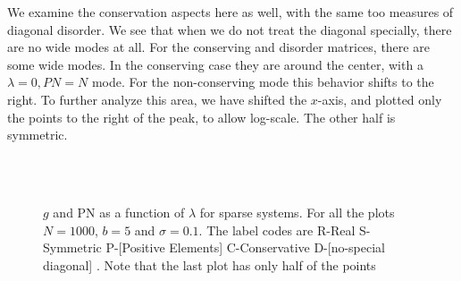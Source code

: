 \documentclass[onecolumn,fleqn,longbibliography]{revtex4}
\begin{document}
We examine the conservation aspects here as well, with the same
too measures of diagonal disorder. We see that when we do not treat the diagonal
specially, there are no wide modes at all. For the conserving and disorder matrices,
there are some wide modes. In the conserving case they are around the center, with a $\lambda=0, PN=N$ mode.
For the non-conserving mode this behavior shifts to the right. To further
analyze this area, we have shifted the $x$-axis, and plotted only the points to the 
right of the peak, to allow log-scale. The other half is symmetric. 
\begin{figure}[H]
  \\
  \\
  \caption{$g$ and PN as a function of $\lambda$ for sparse systems.
  For all the plots $N=1000$, $b=5$ and $\sigma=0.1$. 
  The label codes are R-Real S-Symmetric P-[Positive Elements] C-Conservative D-[no-special diagonal] . Note
  that the last plot has only half of the points}
  \label{fig:pta_sym2}
\end{figure}
\end{document}
